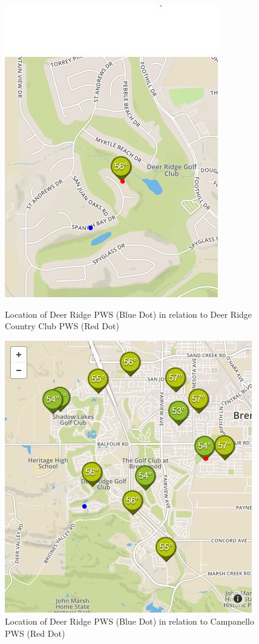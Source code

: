 \documentclass[sigconf]{acmart}
\begin{document}
\begin{figure}[p]
    \centering
    \includegraphics[width=.56\columnwidth]{images/DR_DRCC.PNG}
    \caption{Location of Deer Ridge PWS (Blue Dot) in relation to Deer Ridge Country Club PWS (Red Dot)}

\bigskip

    \centering
    \includegraphics[width=.56\columnwidth]{images/DR_Campinello.PNG}
    \caption{Location of Deer Ridge PWS (Blue Dot) in relation to Campanello PWS (Red Dot)}

\bigskip


\end{figure}
\end{document}
